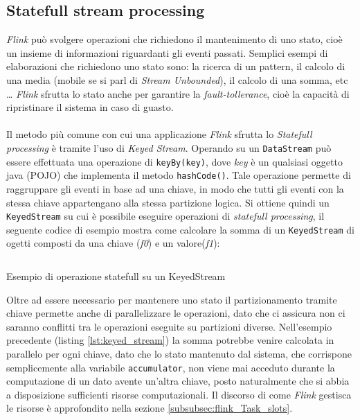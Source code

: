 \subsection{Statefull stream processing}
\label{subsec:flink_statefull_processing}
\textit{Flink} può svolgere operazioni che richiedono il mantenimento di uno stato, cioè un insieme di informazioni riguardanti gli eventi passati.
Semplici esempi di elaborazioni che richiedono uno stato sono: la ricerca di un pattern, il calcolo di una media (mobile se si parl di \textit{Stream Unbounded}), il calcolo di una somma, etc \dots
\textit{Flink} sfrutta lo stato anche per garantire la \textit{fault-tollerance}, cioè la capacità di ripristinare il sistema in caso di guasto.\\\\
Il metodo più comune con cui una applicazione \textit{Flink} sfrutta lo \textit{Statefull processing} è tramite l'uso di \textit{Keyed Stream}.
Operando su un \texttt{DataStream} può essere effettuata una operazione di \texttt{keyBy(key)}, dove \textit{key} è un qualsiasi oggetto java (POJO) che implementa il metodo \texttt{hashCode()}.
Tale operazione permette di raggruppare gli eventi in base ad una chiave, in modo che tutti gli eventi con la stessa chiave appartengano alla stessa partizione logica.
Si ottiene quindi un \texttt{KeyedStream} su cui è possibile eseguire operazioni di \textit{statefull processing}, 
il seguente codice di esempio mostra come calcolare la somma di un \texttt{KeyedStream} di ogetti composti da una chiave (\textit{f0}) e un valore(\textit{f1}):\\
\begin{code}
    \inputminted{java}{listings/keyed-stream.java}
    \caption{Esempio di operazione statefull su un KeyedStream}
    \label{lst:keyed_stream}
\end{code}
Oltre ad essere necessario per mantenere uno stato il partizionamento tramite chiave permette anche di parallelizzare le operazioni, 
dato che ci assicura non ci saranno conflitti tra le operazioni eseguite su partizioni diverse.
Nell'esempio precedente (listing \ref{lst:keyed_stream}) la somma potrebbe venire calcolata in parallelo per ogni chiave, dato che lo stato mantenuto dal sistema,
che corrispone semplicemente alla variabile \texttt{accumulator}, non viene mai acceduto durante la computazione di un dato avente un'altra chiave, posto naturalmente che si abbia a disposizione sufficienti risorse computazionali.
Il discorso di come \textit{Flink} gestisca le risorse è approfondito nella sezione \ref{subsubsec:flink_Task_slots}.

